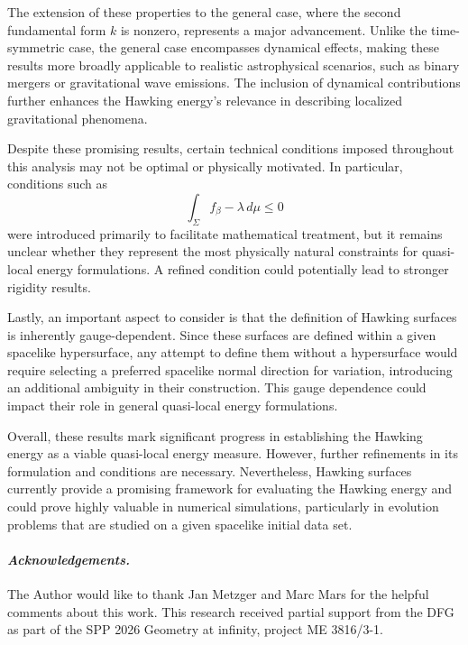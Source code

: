 \documentclass[12pt,a4paper]{amsart}
\theoremstyle{plain}
\theoremstyle{definition}
\begin{document}
The extension of these properties to the general case, where the second fundamental form $k$ is nonzero, represents a major advancement. Unlike the time-symmetric case, the general case encompasses dynamical effects, making these results more broadly applicable to realistic astrophysical scenarios, such as binary mergers or gravitational wave emissions. The inclusion of dynamical contributions further enhances the Hawking energy's relevance in describing localized gravitational phenomena.



Despite these promising results, certain technical conditions imposed throughout this analysis may not be optimal or physically motivated. In particular, conditions such as
$$\int_\Sigma f_\beta -\lambda \, d\mu \leq 0$$
were introduced primarily to facilitate mathematical treatment, but it remains unclear whether they represent the most physically natural constraints for quasi-local energy formulations. A refined condition could potentially lead to stronger rigidity results.



Lastly, an important aspect to consider is that the definition of Hawking surfaces is inherently gauge-dependent. Since these surfaces are defined within a given spacelike hypersurface, any attempt to define them without a hypersurface would require selecting a preferred spacelike normal direction for variation, introducing an additional ambiguity in their construction. This gauge dependence could impact their role in general quasi-local energy formulations.


Overall, these results mark significant progress in establishing the Hawking energy as a viable quasi-local energy measure. However, further refinements in its formulation and conditions are necessary. Nevertheless, Hawking surfaces currently provide a promising framework for evaluating the Hawking energy and could prove highly valuable in numerical simulations, particularly in evolution problems that are studied on a given spacelike initial data set.

\vspace{1.5 cm}




 \paragraph*{\emph{Acknowledgements.}} The Author would like to thank Jan Metzger and Marc Mars for the helpful comments about this work. This research received partial support from the DFG as part of the SPP 2026 Geometry at infinity, project ME 3816/3-1.
















\end{document}
